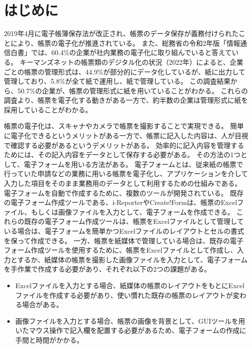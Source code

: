 \chapter{はじめに}\label{cha:Introduction}
2019年4月に電子帳簿保存法が改正され、帳票のデータ保存が義務付けられたことにより、帳票の電子化が推進されている\cite{電子帳簿保存法}。
また、総務省の令和2年版「情報通信白書」では、60.4\%の企業が社内業務の電子化に取り組んでいると答えている\cite{デジタルデータの経済的価値の計測と活用の現状に関する調査研究}。
キーマンズネットの帳票類のデジタル化の状況（2022年）によると、企業ごとの帳票の管理形式は、44.9\%が部分的にデータ化しているが、紙に出力して管理しており、5.8\%が全て紙で運用し、紙で管理している\cite{帳票類のデジタル化の状況}。
この調査結果から、50.7\%の企業が、帳票の管理形式に紙を用いていることがわかる。
これらの調査より、帳票を電子化する動きがある一方で、約半数の企業は管理形式に紙を採用していることがわかる。

帳票の電子化は、スキャナやカメラで帳票を撮影することで実現できる。
簡単に電子化できるというメリットがある一方で、帳票に記入した内容は、人が目視で確認する必要があるというデメリットがある。
効率的に記入内容を管理するためには、その記入内容をデータとして保存する必要がある。
その方法の1つとして、電子フォームを用いる方法がある。
電子フォームとは、従来紙の帳票で行っていた申請などの業務に用いる帳票を電子化し、アプリケーションを介して入力した項目をそのまま業務用のデータとして利用するための仕組みである\cite{電子フォーム}。
電子フォームを自動で作成するために、複数のツールが開発されている。
既存の電子フォーム作成ツールである、i-Reporter\cite{i-Reporter}やCreate!Form\cite{Create!Form}は、帳票のExcelファイル、もしくは画像ファイルを入力として、電子フォームを作成できる。
これらの既存の電子フォーム作成ツールは、帳票をExcelファイルとして管理している場合は、電子フォームを簡単かつExcelファイルのレイアウトとセルの書式を保って作成できる。
一方、帳票を紙媒体で管理している場合は、既存の電子フォーム作成ツールを使用するために、帳票をExcelファイルとして作成し、入力とするか、紙媒体の帳票を撮影した画像ファイルを入力として、電子フォームを手作業で作成する必要があり、それぞれ以下の2つの課題がある。

\begin{itemize}
  \item Excelファイルを入力とする場合、紙媒体の帳票のレイアウトをもとにExcelファイルを作成する必要があり、使い慣れた既存の帳票のレイアウトが変わる場合がある。
  \item 画像ファイルを入力とする場合、帳票の画像を背景として、GUIツールを用いたマウス操作で記入欄を配置する必要があるため、電子フォームの作成に手間と時間がかかる。
\end{itemize}

